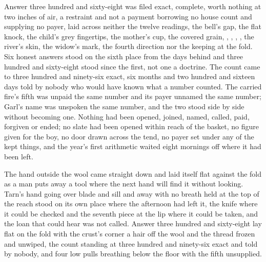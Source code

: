 Answer three hundred and sixty-eight was filed exact, complete, worth nothing at two inches of air, a restraint and not a payment borrowing no house count and supplying no payer, laid across neither the twelve readings, the bell's gap, the flat knock, the child's grey fingertips, the mother's cup, the covered grain, , , , , the river's skin, the widow's mark, the fourth direction nor the keeping at the fold. Six honest answers stood on the sixth place from the days behind and three hundred and sixty-eight stood since the first, not one a doctrine. The count came to three hundred and ninety-six exact, six months and two hundred and sixteen days told by nobody who would have known what a number counted. The carried fire's fifth was unpaid the same number and its payer unnamed the same number; Garl's name was unspoken the same number, and the two stood side by side without becoming one. Nothing had been opened, joined, named, called, paid, forgiven or ended; no slate had been opened within reach of the basket, no figure given for the boy, no door drawn across the tend, no payer set under any of the kept things, and the year's first arithmetic waited eight mornings off where it had been left.

The hand outside the wool came straight down and laid itself flat against the fold as a man puts away a tool where the next hand will find it without looking. Tarn's hand going over blade and sill and away with no breath held at the top of the reach stood on its own place where the afternoon had left it, the knife where it could be checked and the seventh piece at the lip where it could be taken, and the loan that could hear was not called. Answer three hundred and sixty-eight lay flat on the fold with the crust's corner a hair off the wool and the thread frozen and unwiped, the count standing at three hundred and ninety-six exact and told by nobody, and four low pulls breathing below the floor with the fifth unsupplied.

